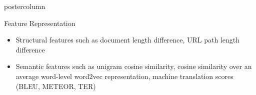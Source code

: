 \documentclass{beamer}
\begin{document}
\begin{frame}
\begin{columns}
\begin{column}{.5\textwidth}
\begin{beamercolorbox}[center]{postercolumn}
\begin{minipage}{.98\textwidth}
{%
  \begin{block}{Feature Representation}

	      \begin{itemize}
		\item Structural features such as document length difference, URL path length difference
	\vspace{0.5em}
		\item Semantic features such as unigram cosine similarity, cosine similarity over an average word-level word2vec representation, machine translation scores (BLEU, METEOR, TER)
		\end{itemize}	
    \end{block}
\vfill

}
\end{minipage}
\end{beamercolorbox}
\end{column}
\end{columns}
\end{frame}
\end{document}
